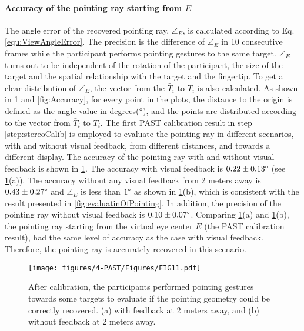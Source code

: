 \paragraph{Accuracy of the pointing ray starting from $E$} 
The angle error of the recovered pointing ray, ${\angle}_{E}$, is calculated according to {Eq.\ref{equ:ViewAngleError}}. The precision is the difference of ${\angle}_{E}$ in 10 consecutive frames while the participant performs pointing gestures to the same target. ${\angle}_{E}$ turns out to be independent of the rotation of the participant, the size of the target and the spatial relationship with the target and the fingertip. To get a clear distribution of ${\angle}_{E}$, the vector from the $\bar T_i$ to $T_i$ is also calculated. As shown in \figurename{ \ref{fig:Accuracy2m}} and \figurename{ \ref{fig:Accuracy}}, for every point in the plots, the distance to the origin is defined as the angle value in degrees($\degree$), and the points are distributed according to the vector from $\bar T_i$ to $T_i$.
The first PAST calibration result in step \ref{step:stereoCalib} is employed to evaluate the pointing ray in different scenarios, with and without visual feedback, from different distances, and towards a different display.
The accuracy of the pointing ray with and without visual feedback is shown in \figurename{ \ref{fig:Accuracy2m}}. The accuracy with visual feedback is  $0.22\pm0.13\degree$ (see \figurename{ \ref{fig:Accuracy2m}(a)}).
The accuracy without any visual feedback from 2 meters away is $0.43\pm0.27\degree$ and ${\angle}_{E}$ is less than $1\degree$ as shown in \figurename{ \ref{fig:Accuracy2m}(b)}, which is consistent with the result presented in \figurename{ \ref{fig:evaluatinOfPointing}}. In addition, the precision of the pointing ray without visual feedback is  $0.10\pm0.07\degree$.
Comparing \figurename{ \ref{fig:Accuracy2m}(a)} and \figurename{ \ref{fig:Accuracy2m}(b)}, the pointing ray starting from the virtual eye center $E$ (the PAST calibration result), had the same level of accuracy as the case with visual feedback. Therefore, the pointing ray is accurately recovered in this scenario.
\begin{figure} 
	\centering
	\texttt{[image: figures/4-PAST/Figures/FIG11.pdf]}
	\caption{After calibration, the participants performed pointing gestures towards some targets to evaluate if the pointing geometry could be correctly recovered. (a) with feedback at 2 meters away, and (b) without feedback at 2 meters away.}
	\label{fig:Accuracy2m}
\end{figure}

